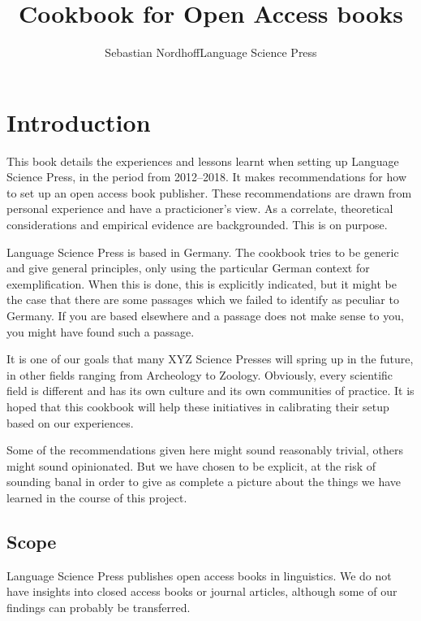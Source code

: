 \documentclass[nonflat,modfonts,output=book] {langsci/langscibook}
\title{Cookbook for Open Access books}
\author{Sebastian Nordhoff\newlineCover Language Science Press}
\begin{document}
\maketitle
\frontmatter 
\tableofcontents 
\mainmatter
\chapter{Introduction}
\largerpage
This book details the experiences and lessons learnt when setting up Language Science Press, in the period from 2012--2018. It makes recommendations for how to set up an open access book publisher. These recommendations are drawn from personal experience and have a practicioner's view. As a correlate, theoretical considerations and empirical evidence are backgrounded. This is on purpose. 

Language Science Press is based in Germany. The cookbook tries to be generic and give general principles, only using the particular German context for exemplification. When this is done, this is explicitly indicated, but it might be the case that there are some passages which we failed to identify as peculiar to Germany. If you are based elsewhere and a passage does not make sense to you, you might have found such a passage.
 

It is one of our goals that many XYZ Science Presses will spring up in the future, in other fields ranging from Archeology to Zoology. Obviously, every scientific field is different and has its own culture and its own communities of practice. It is hoped that this cookbook will help these initiatives in calibrating their setup based on our experiences. 

Some of the recommendations given here might sound reasonably trivial, others might sound opinionated. But we have chosen to be explicit, at the risk of sounding banal in order to give as complete a picture about the things we have learned in the course of this project.

\section{Scope}
Language Science Press publishes open access books in linguistics. We do not have insights into closed access books or journal articles, although some of our findings can probably be transferred. 
\end{document}
